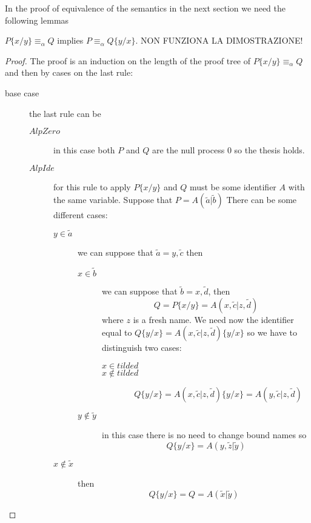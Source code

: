 In the proof of equivalence of the semantics in the next section we need the following lemmas


\begin{lemma}
  $P\{x/y\}\equiv_{\alpha}Q$ implies $P\equiv_{\alpha}Q\{y/x\}$. NON FUNZIONA LA DIMOSTRAZIONE!
  \begin{proof}
    The proof is an induction on the length of the proof tree of $P\{x/y\}\equiv_{\alpha}Q$ and then by cases on the last rule:
    \begin{description}
      \item[base case]
	the last rule can be
	\begin{description}
	  \item[$AlpZero$]
	    in this case both $P$ and $Q$ are the null process $0$ so the thesis holds.
	  \item[$AlpIde$]
 	    for this rule to apply $P\{x/y\}$ and $Q$ must be some identifier $A$ with the same variable. Suppose that 
	    $P=A(\tilde{a}|\tilde{b})$
	    There can be some different cases:
	    \begin{description}
	      \item[$y\in \tilde{a}$]
		we can suppose that $\tilde{a}=y, \tilde{c}$ then
		\begin{description}
		  \item[$x\in \tilde{b}$]
		    we can suppose that $\tilde{b}=x, \tilde{d}$, then
		    \[
		      Q=P\{x/y\}=A(x, \tilde{c}|z, \tilde{d})
		    \]
		    where $z$ is a fresh name. We need now the identifier equal to $Q\{y/x\}=A(x, \tilde{c}|z, \tilde{d})\{y/x\}$ so we have to distinguish two cases:
		    \begin{description}
		      \item[$x\in tilde{d}$]
			
		      \item[$x\notin tilde{d}$]
		      \[
			Q\{y/x\}=A(x, \tilde{c}|z, \tilde{d})\{y/x\}=A(y, \tilde{c}|z, \tilde{d})
		      \]			
		    \end{description}
		  \item[$y\notin \tilde{y}$]
		    in this case there is no need to change bound names so 
		    \[
		      Q\{y/x\}=A(y, \tilde{z}|\tilde{y})
		    \]
		\end{description}
	      \item[$x\notin \tilde{x}$]
		then 
		\[
		  Q\{y/x\}=Q=A(\tilde{x}|\tilde{y})
		\]
		  
	    \end{description}


\end{description}
\end{description}
\end{proof}
\end{lemma}
